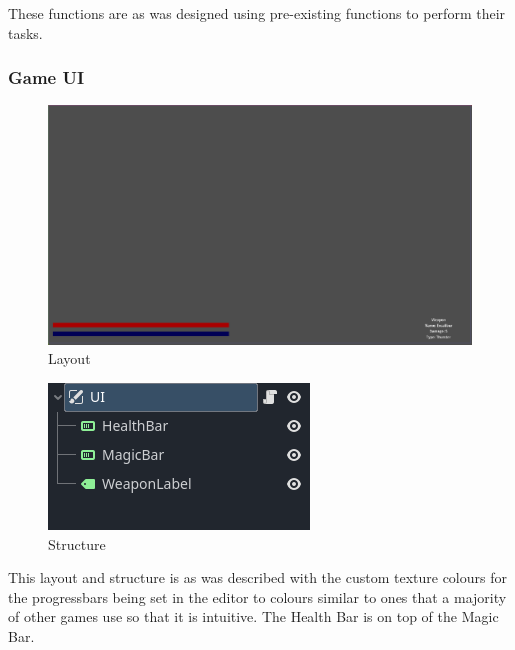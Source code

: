 \documentclass{article}
\begin{document}
        These functions are as was designed using pre-existing functions to perform their tasks.\\
        \subsubsection{Game UI}
        \begin{multicols}{2}
                \begin{figure}[H]
                        \centering
                        \includegraphics[width = 0.8\columnwidth]{images/development/GameUI_layout.PNG}
                        \caption{Layout}
                \end{figure}
                \begin{figure}[H]
                        \centering
                        \includegraphics[width = 0.8\columnwidth]{images/development/GameUI_structure.PNG}
                        \caption{Structure}
                \end{figure}   
        \end{multicols}
        This layout and structure is as was described with the custom texture colours for the progressbars being set in the editor to colours similar to ones that a majority of other games use so that it is intuitive. The Health Bar is on top of the Magic Bar.\\
\end{document}

